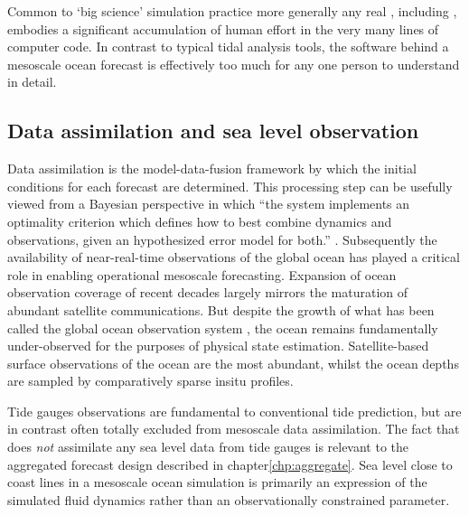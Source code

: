 Common to `big science' simulation practice more generally \citep{Petersen:2012tr} any real \OGCM{}, including \BL{}, embodies a significant accumulation of human effort in the very many lines of computer code.  In contrast to typical tidal analysis tools, the software behind a mesoscale ocean forecast is effectively too much for any one person to understand in detail.
\subsection{Data assimilation and sea level observation}
Data assimilation is the model-data-fusion framework by which the initial conditions for each \OCGM{} forecast are determined.
This processing step can be usefully viewed from a Bayesian perspective in which ``the system implements an optimality criterion which defines how to best combine dynamics and observations, given an hypothesized error model for both.'' \citep{10.1007/978-94-007-0332-2_13}.
Subsequently the availability of near-real-time observations of the global ocean has played a critical role in enabling operational mesoscale forecasting.  Expansion of ocean observation coverage of recent decades largely mirrors the maturation of abundant satellite communications.  But despite the growth of what has been called the global ocean observation system \GOOS{} \citep{Komen:1999ch}, the ocean remains fundamentally under-observed for the purposes of physical state estimation.   Satellite-based surface observations of the ocean are the most abundant, whilst the ocean depths are sampled by comparatively sparse insitu profiles.


Tide gauges observations are fundamental to conventional tide prediction, but are in contrast often totally excluded from mesoscale data assimilation.   The fact that \BL{} does \emph{not} assimilate any sea level data from tide gauges is relevant to the aggregated forecast design described in chapter\ref{chp:aggregate}.      
Sea level close to coast lines in a mesoscale ocean simulation is primarily an expression of the simulated fluid dynamics rather than an observationally constrained parameter.


